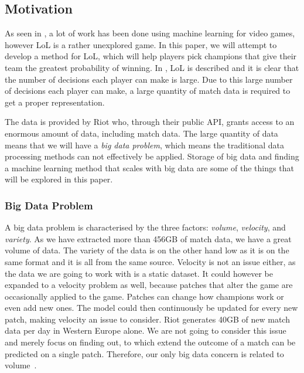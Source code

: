 \subsection{Motivation}\label{sec:motivation}
As seen in , a lot of work has been done using machine learning for video games, however LoL is a rather unexplored game. 
In this paper, we will attempt to develop a method for LoL, which will help players pick champions that give their team the greatest probability of winning. In , LoL is described and it is clear that the number of decisions each player can make is large. Due to this large number of decisions each player can make, a large quantity of match data is required to get a proper representation. 

The data is provided by Riot who, through their public API, grants access to an enormous amount of data, including match data.
The large quantity of data means that we will have a \emph{big data problem}, which means the traditional data processing methods can not effectively be applied. Storage of big data and finding a machine learning method that scales with big data are some of the things that will be explored in this paper.

\subsubsection{Big Data Problem}\label{sec:big_data_problem}
A big data problem is characterised by the three factors: \emph{volume}, \emph{velocity}, and \emph{variety}. As we have extracted more than 456GB of match data, we have a great volume of data. The variety of the data is on the other hand low as it is on the same format and it is all from the same source. Velocity is not an issue either, as the data we are going to work with is a static dataset. It could however be expanded to a velocity problem as well, because patches that alter the game are occasionally applied to the game. Patches can change how champions work or even add new ones. The model could then continuously be updated for every new patch, making velocity an issue to consider. Riot generates 40GB of new match data per day in Western Europe alone. We are not going to consider this issue and merely focus on finding out, to which extend the outcome of a match can be predicted on a single patch. Therefore, our only big data concern is related to volume~\cite{madden2012databases}.

